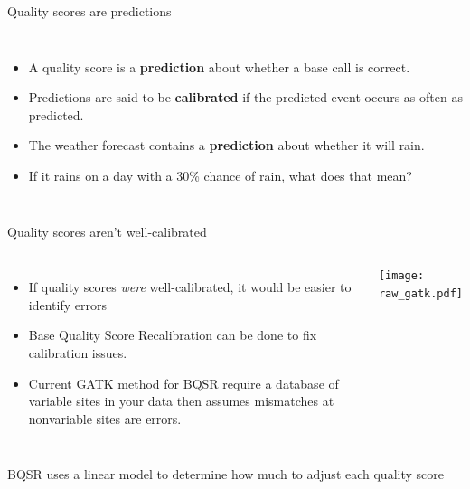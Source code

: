 \documentclass{beamer}
\begin{document}
\begin{frame}{Quality scores are predictions}
\begin{columns}
\begin{itemize}
\item A quality score is a \textbf{prediction} about whether a base call is correct.
\item Predictions are said to be \textbf{calibrated} if the predicted event occurs as often as predicted.
\item The weather forecast contains a \textbf{prediction} about whether it will rain.
\item If it rains on a day with a 30\% chance of rain, what does that mean?
\end{itemize}
\end{columns}
\end{frame}

\begin{frame}{Quality scores aren't well-calibrated}
\begin{columns}
\begin{itemize}
\item If quality scores \textit{were} well-calibrated, it would be easier to identify errors
\item Base Quality Score Recalibration can be done to fix calibration issues.
\item Current GATK method for BQSR require a database of variable sites in your data
then assumes mismatches at nonvariable sites are errors.
\end{itemize}
\texttt{[image: raw\_gatk.pdf]}
\end{columns}
\end{frame}

\begin{frame}{BQSR uses a linear model to determine how much to adjust each quality score}
\centering
{}
\end{frame}
\end{document}
